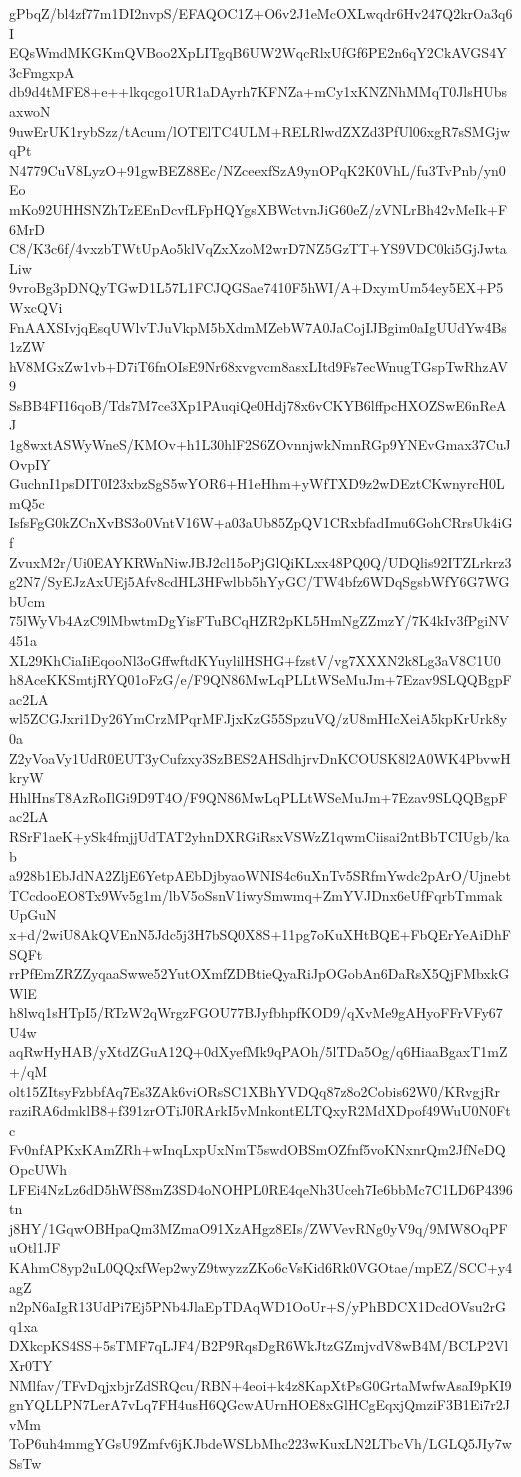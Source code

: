 gPbqZ/bl4zf77m1DI2nvpS/EFAQOC1Z+O6v2J1eMcOXLwqdr6Hv247Q2krOa3q6I
EQsWmdMKGKmQVBoo2XpLITgqB6UW2WqcRlxUfGf6PE2n6qY2CkAVGS4Y3cFmgxpA
db9d4tMFE8+e++lkqcgo1UR1aDAyrh7KFNZa+mCy1xKNZNhMMqT0JlsHUbsaxwoN
9uwErUK1rybSzz/tAcum/lOTElTC4ULM+RELRlwdZXZd3PfUl06xgR7sSMGjwqPt
N4779CuV8LyzO+91gwBEZ88Ec/NZceexfSzA9ynOPqK2K0VhL/fu3TvPnb/yn0Eo
mKo92UHHSNZhTzEEnDcvfLFpHQYgsXBWctvnJiG60eZ/zVNLrBh42vMeIk+F6MrD
C8/K3c6f/4vxzbTWtUpAo5klVqZxXzoM2wrD7NZ5GzTT+YS9VDC0ki5GjJwtaLiw
9vroBg3pDNQyTGwD1L57L1FCJQGSae7410F5hWI/A+DxymUm54ey5EX+P5WxcQVi
FnAAXSIvjqEsqUWlvTJuVkpM5bXdmMZebW7A0JaCojIJBgim0aIgUUdYw4Bs1zZW
hV8MGxZw1vb+D7iT6fnOIsE9Nr68xvgvcm8asxLItd9Fs7ecWnugTGspTwRhzAV9
SsBB4FI16qoB/Tds7M7ce3Xp1PAuqiQe0Hdj78x6vCKYB6lffpcHXOZSwE6nReAJ
1g8wxtASWyWneS/KMOv+h1L30hlF2S6ZOvnnjwkNmnRGp9YNEvGmax37CuJOvpIY
GuchnI1psDIT0I23xbzSgS5wYOR6+H1eHhm+yWfTXD9z2wDEztCKwnyrcH0LmQ5c
IsfsFgG0kZCnXvBS3o0VntV16W+a03aUb85ZpQV1CRxbfadImu6GohCRrsUk4iGf
ZvuxM2r/Ui0EAYKRWnNiwJBJ2cl15oPjGlQiKLxx48PQ0Q/UDQlis92ITZLrkrz3
g2N7/SyEJzAxUEj5Afv8cdHL3HFwlbb5hYyGC/TW4bfz6WDqSgsbWfY6G7WGbUcm
75lWyVb4AzC9lMbwtmDgYisFTuBCqHZR2pKL5HmNgZZmzY/7K4kIv3fPgiNV451a
XL29KhCiaIiEqooNl3oGffwftdKYuylilHSHG+fzstV/vg7XXXN2k8Lg3aV8C1U0
h8AceKKSmtjRYQ01oFzG/e/F9QN86MwLqPLLtWSeMuJm+7Ezav9SLQQBgpFac2LA
wl5ZCGJxri1Dy26YmCrzMPqrMFJjxKzG55SpzuVQ/zU8mHIcXeiA5kpKrUrk8y0a
Z2yVoaVy1UdR0EUT3yCufzxy3SzBES2AHSdhjrvDnKCOUSK8l2A0WK4PbvwHkryW
HhlHnsT8AzRoIlGi9D9T4O/F9QN86MwLqPLLtWSeMuJm+7Ezav9SLQQBgpFac2LA
RSrF1aeK+ySk4fmjjUdTAT2yhnDXRGiRsxVSWzZ1qwmCiisai2ntBbTCIUgb/kab
a928b1EbJdNA2ZljE6YetpAEbDjbyaoWNIS4c6uXnTv5SRfmYwdc2pArO/Ujnebt
TCcdooEO8Tx9Wv5g1m/lbV5oSsnV1iwySmwmq+ZmYVJDnx6eUfFqrbTmmakUpGuN
x+d/2wiU8AkQVEnN5Jdc5j3H7bSQ0X8S+11pg7oKuXHtBQE+FbQErYeAiDhFSQFt
rrPfEmZRZZyqaaSwwe52YutOXmfZDBtieQyaRiJpOGobAn6DaRsX5QjFMbxkGWlE
h8lwq1sHTpI5/RTzW2qWrgzFGOU77BJyfbhpfKOD9/qXvMe9gAHyoFFrVFy67U4w
aqRwHyHAB/yXtdZGuA12Q+0dXyefMk9qPAOh/5lTDa5Og/q6HiaaBgaxT1mZ+/qM
olt15ZItsyFzbbfAq7Es3ZAk6viORsSC1XBhYVDQq87z8o2Cobis62W0/KRvgjRr
raziRA6dmklB8+f391zrOTiJ0RArkI5vMnkontELTQxyR2MdXDpof49WuU0N0Ftc
Fv0nfAPKxKAmZRh+wInqLxpUxNmT5swdOBSmOZfnf5voKNxnrQm2JfNeDQOpcUWh
LFEi4NzLz6dD5hWfS8mZ3SD4oNOHPL0RE4qeNh3Uceh7Ie6bbMc7C1LD6P4396tn
j8HY/1GqwOBHpaQm3MZmaO91XzAHgz8EIs/ZWVevRNg0yV9q/9MW8OqPFuOtl1JF
KAhmC8yp2uL0QQxfWep2wyZ9twyzzZKo6cVsKid6Rk0VGOtae/mpEZ/SCC+y4agZ
n2pN6aIgR13UdPi7Ej5PNb4JlaEpTDAqWD1OoUr+S/yPhBDCX1DcdOVsu2rGq1xa
DXkcpKS4SS+5sTMF7qLJF4/B2P9RqsDgR6WkJtzGZmjvdV8wB4M/BCLP2VlXr0TY
NMlfav/TFvDqjxbjrZdSRQcu/RBN+4eoi+k4z8KapXtPsG0GrtaMwfwAsaI9pKI9
gnYQLLPN7LerA7vLq7FH4usH6QGcwAUrnHOE8xGlHCgEqxjQmziF3B1Ei7r2JvMm
ToP6uh4mmgYGsU9Zmfv6jKJbdeWSLbMhc223wKuxLN2LTbcVh/LGLQ5JIy7wSsTw
